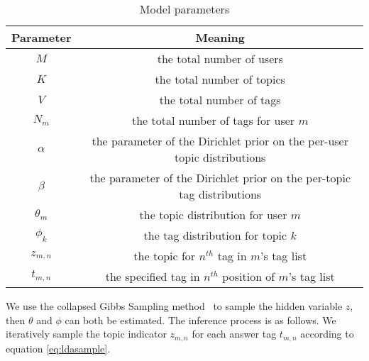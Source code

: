
\begin{table}[htbp]
\caption{Model parameters}
\label{tab:parameters}
\centering
\begin{tabular}{|c|c|}
\hline
Parameter & Meaning \\
\hline
$M$ & the total number of users\\
\hline
$K$ & the total number of topics\\
\hline
$V$ & the total number of tags\\
\hline
$N_m$ & the total number of tags for user $m$\\
\hline
$\alpha$ & the parameter of the Dirichlet prior on the per-user topic distributions \\
\hline
$\beta$ & the parameter of the Dirichlet prior on the per-topic tag distributions  \\
\hline
$\theta_m$ & the topic distribution for user $m$ \\
\hline
$\phi_k$ & the tag distribution for topic $k$ \\
\hline
$z_{m,n}$ & the topic for $n^{th}$ tag in $m$'s tag list \\
\hline
$t_{m,n}$ & the specified tag in $n^{th}$ position of $m$'s tag list\\
\hline

\end{tabular}
\end{table}

We use the collapsed Gibbs Sampling method~\cite{griffiths2004finding} to sample the hidden variable $z$, then $\theta$ and $\phi$ can both be estimated.
The inference process is as follows.
We iteratively sample the topic indicator $z_{m,n}$ for each answer tag $t_{m,n}$ according to equation \ref{eq:ldasample}. 


